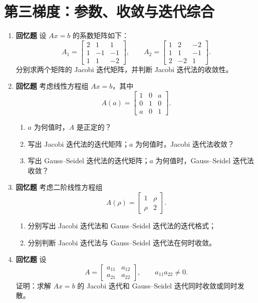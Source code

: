 \documentclass{article}
\newcommand{\oldtag}{\textcolor{red!65!black}{\textbf{回忆题}}}
\begin{document}
\section{第三梯度：参数、收敛与迭代综合}

\begin{enumerate}
  \item \oldtag{} 设 $Ax=b$ 的系数矩阵如下：
  \[
    A_1=\begin{bmatrix}2&1&1\\1&-1&-1\\1&1&-2\end{bmatrix},\qquad
    A_2=\begin{bmatrix}1&2&-2\\1&1&-1\\2&-2&1\end{bmatrix}.
  \]
  分别求两个矩阵的 Jacobi 迭代矩阵，并判断 Jacobi 迭代法的收敛性。

  \item \oldtag{} 考虑线性方程组 $Ax=b$，其中
  \[
    A(a)=\begin{bmatrix}1&0&a\\0&1&0\\a&0&1\end{bmatrix}.
  \]
  \begin{enumerate}[(1)]
    \item $a$ 为何值时，$A$ 是正定的？
    \item 写出 Jacobi 迭代法的迭代矩阵；$a$ 为何值时，Jacobi 迭代法收敛？
    \item 写出 Gauss--Seidel 迭代法的迭代矩阵；$a$ 为何值时，Gauss--Seidel 迭代法收敛？
  \end{enumerate}

  \item \oldtag{} 考虑二阶线性方程组
  \[
    A(\rho)=\begin{bmatrix}1&\rho\\ \rho&2\end{bmatrix}.
  \]
  \begin{enumerate}[(1)]
    \item 分别写出 Jacobi 迭代法和 Gauss--Seidel 迭代法的迭代格式；
    \item 分别判断 Jacobi 迭代法与 Gauss--Seidel 迭代法在何时收敛。
  \end{enumerate}

  \item \oldtag{} 设
  \[
    A=\begin{bmatrix}a_{11}&a_{12}\\a_{21}&a_{22}\end{bmatrix},\qquad a_{11}a_{22}\ne0.
  \]
  证明：求解 $Ax=b$ 的 Jacobi 迭代和 Gauss--Seidel 迭代同时收敛或同时发散。


\end{enumerate}
\end{document}
